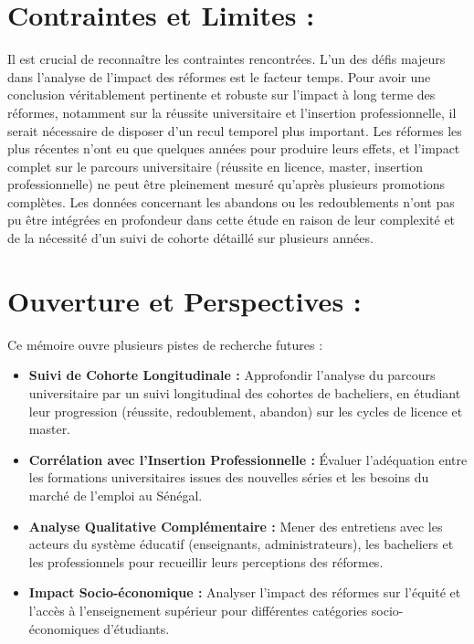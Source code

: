 \section*{Contraintes et Limites :}

Il est crucial de reconnaître les contraintes rencontrées. 
L'un des défis majeurs dans l'analyse de l'impact des réformes est le facteur temps. Pour avoir une conclusion véritablement pertinente et robuste sur l'impact à long terme des réformes, notamment sur la réussite universitaire et l'insertion professionnelle, il serait nécessaire de disposer d'un recul temporel plus important. 
Les réformes les plus récentes n'ont eu que quelques années pour produire leurs effets, et l'impact complet sur le parcours universitaire (réussite en licence, master, insertion professionnelle) ne peut être pleinement mesuré qu'après plusieurs promotions complètes. 
Les données concernant les abandons ou les redoublements n'ont pas pu être intégrées en profondeur dans cette étude en raison de leur complexité et de la nécessité d'un suivi de cohorte détaillé sur plusieurs années.

\section*{Ouverture et Perspectives :}

Ce mémoire ouvre plusieurs pistes de recherche futures :
\begin{itemize}
    \item \textbf{Suivi de Cohorte Longitudinale :} Approfondir l'analyse du parcours universitaire par un suivi longitudinal des cohortes de bacheliers, en étudiant leur progression (réussite, redoublement, abandon) sur les cycles de licence et master.
    \item \textbf{Corrélation avec l'Insertion Professionnelle :} Évaluer l'adéquation entre les formations universitaires issues des nouvelles séries et les besoins du marché de l'emploi au Sénégal.
    \item \textbf{Analyse Qualitative Complémentaire :} Mener des entretiens avec les acteurs du système éducatif (enseignants, administrateurs), les bacheliers et les professionnels pour recueillir leurs perceptions des réformes.
    \item \textbf{Impact Socio-économique :} Analyser l'impact des réformes sur l'équité et l'accès à l'enseignement supérieur pour différentes catégories socio-économiques d'étudiants.
\end{itemize}


